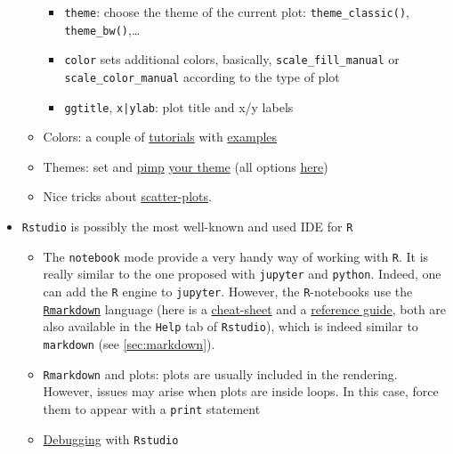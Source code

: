 \documentclass[a4paper,12pt,%
              final%
              ]{article}
\begin{document}
\begin{itemize}
\begin{itemize}
\begin{itemize}
          \item \verb|theme|: choose the theme of the current plot: \verb|theme_classic()|, \verb|theme_bw()|,\ldots
          \item \verb|color| sets additional colors, basically, \verb|scale_fill_manual| or \verb|scale_color_manual| according to the type of plot
          \item \verb|ggtitle|, \verb!x|ylab!: plot title and x/y labels
        \end{itemize}
      \item Colors: a couple of \href{http://www.sthda.com/english/wiki/ggplot2-colors-how-to-change-colors-automatically-and-manually#change-colors-by-groups}{tutorials} with \href{https://www.datanovia.com/en/blog/ggplot-colors-best-tricks-you-will-love/}{examples}
      \item Themes: set and \href{https://bookdown.org/rdpeng/RProgDA/building-a-new-theme.html}{pimp} \href{https://ggplot2.tidyverse.org/reference/theme_get.html}{your theme} (all options \href{https://ggplot2.tidyverse.org/reference/theme.html}{here})
      \item Nice tricks about \href{http://www.sthda.com/english/wiki/ggplot2-scatter-plots-quick-start-guide-r-software-and-data-visualization}{scatter-plots}.
    \end{itemize}
  \item \texttt{Rstudio} is possibly the most well-known and used IDE for \texttt{R}
    \begin{itemize}
      \item The \texttt{notebook} mode provide a very handy way of working with \texttt{R}. It is really similar to the one proposed with \texttt{jupyter} and \texttt{python}. Indeed, one can add the \texttt{R} engine to \texttt{jupyter}. However, the \texttt{R}-notebooks use the \href{https://rmarkdown.rstudio.com/index.html}{\texttt{Rmarkdown}} language (here is a \href{https://raw.githubusercontent.com/rstudio/cheatsheets/master/rmarkdown-2.0.pdf}{cheat-sheet} and a \href{https://www.rstudio.com/wp-content/uploads/2015/03/rmarkdown-reference.pdf}{reference guide}, both are also available in the \texttt{Help} tab of \texttt{Rstudio}), which is indeed similar to \texttt{markdown} (see \autoref{sec:markdown}).
      \item \texttt{Rmarkdown} and plots: plots are usually included in the rendering. However, issues may arise when plots are inside loops. In this case, force them to appear with a \verb|print| statement
      \item \href{https://support.rstudio.com/hc/en-us/articles/200713843?version=1.4.1717&mode=desktop}{Debugging} with \texttt{Rstudio}

\end{itemize}
\end{itemize}
\end{document}
